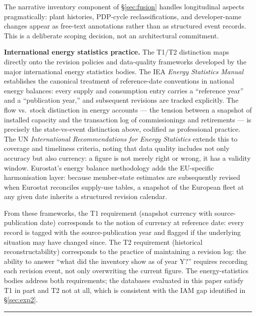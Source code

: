\documentclass[a4paper,11pt]{article}
\begin{document}
The narrative inventory component of §\ref{sec:fusion} handles
longitudinal aspects pragmatically: plant histories, PDP-cycle
reclassifications, and developer-name changes appear as free-text
annotations rather than as structured event records. This is a
deliberate scoping decision, not an architectural commitment.

\textbf{International energy statistics practice.} The T1/T2 distinction
maps directly onto the revision policies and data-quality frameworks
developed by the major international energy statistics bodies. The IEA
\emph{Energy Statistics Manual} \citep{IEA2004:energy-statistics-manual}
establishes the canonical treatment of reference-date conventions in
national energy balances: every supply and consumption entry carries a
``reference year'' and a ``publication year,'' and subsequent revisions
are tracked explicitly. The flow vs.~stock distinction in energy
accounts --- the tension between a snapshot of installed capacity and
the transaction log of commissionings and retirements --- is precisely
the state-vs-event distinction above, codified as professional practice.
The UN \emph{International Recommendations for Energy Statistics}
\citep{UNSD2012:ires} extends this to coverage and timeliness criteria,
noting that data quality includes not only accuracy but also currency: a
figure is not merely right or wrong, it has a validity window.
Eurostat's energy balance methodology
\citep{Eurostat2019:energy-balance-guide} adds the EU-specific
harmonisation layer: because member-state estimates are subsequently
revised when Eurostat reconciles supply-use tables, a snapshot of the
European fleet at any given date inherits a structured revision
calendar.

From these frameworks, the T1 requirement (snapshot currency with
source-publication date) corresponds to the notion of currency at
reference date: every record is tagged with the source-publication year
and flagged if the underlying situation may have changed since. The T2
requirement (historical reconstructability) corresponds to the practice
of maintaining a revision log: the ability to answer ``what did the
inventory show as of year Y?'' requires recording each revision event,
not only overwriting the current figure. The energy-statistics bodies
address both requirements; the databases evaluated in this paper satisfy
T1 in part and T2 not at all, which is consistent with the IAM gap
identified in §\ref{sec:exp2}.

\begin{center}\rule{0.5\linewidth}{0.5pt}\end{center}
\end{document}
